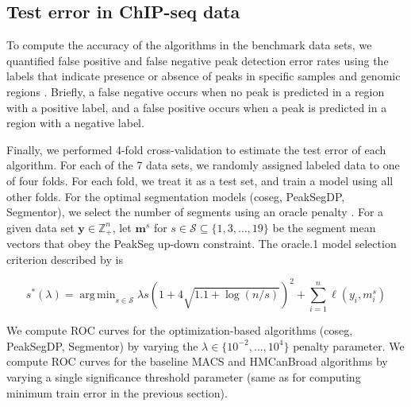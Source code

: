 \documentclass{article}
\DeclareMathOperator*{\argmin}{arg\,min}
\newcommand{\ZZ}{\mathbb Z}
\begin{document}


\subsection{Test error in ChIP-seq data}

To compute the accuracy of the algorithms in the benchmark data sets,
we quantified false positive and false negative peak detection error
rates using the labels that indicate presence or absence of peaks in
specific samples and genomic regions
\citep{HOCKING2016-chipseq}. Briefly, a false negative occurs when no
peak is predicted in a region with a positive label, and a false
positive occurs when a peak is predicted in a region with a negative
label.

Finally, we performed 4-fold cross-validation to estimate the test
error of each algorithm. For each of the 7 data sets, we randomly
assigned labeled data to one of four folds. For each fold, we treat it
as a test set, and train a model using all other folds. For the
optimal segmentation models (coseg, PeakSegDP, Segmentor), we select
the number of segments using an oracle penalty
\citep{cleynen2013segmentation}. For a given data set
$\mathbf y\in\ZZ_+^n$, let $\mathbf m^s$ for
$s\in\mathcal S\subseteq \{1, 3,\dots, 19\}$ be the segment mean
vectors that obey the PeakSeg up-down constraint. The oracle.1 model
selection criterion described by \citet{HOCKING-PeakSeg} is

\begin{equation}
  \label{eq:oracle}
  s^*(\lambda) = \argmin_{s\in\mathcal S}
  \lambda s\left(1 + 4\sqrt{1.1 + \log(n/s)}\right)^2
  +\sum_{i=1}^n \ell(y_i, m_i^s)
\end{equation}

We compute ROC curves for the optimization-based algorithms (coseg,
PeakSegDP, Segmentor) by varying the
$\lambda\in\{10^{-2}, \dots,10^4\}$ penalty parameter. We compute ROC
curves for the baseline MACS and HMCanBroad algorithms by varying a
single significance threshold parameter (same as for computing minimum
train error in the previous section).
\end{document}
